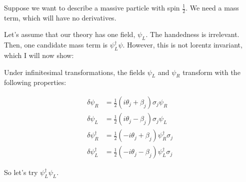 \documentclass{article}
\begin{document}
%	
%	
%	
%	

Suppose we want to describe a massive particle with spin $\frac12$.
We need a mass term, which will have no derivatives.

Let's assume that our theory has one field, $\psi_L$.
The handedness is irrelevant.
Then, one candidate mass term is $\psi_L^\dagger \psi$.
However, this is not lorentz invariant, which I will now show:

Under infinitesimal transformations, the fields $\psi_L$ and $\psi_R$ transform
	with the following properties:

\begin{align}
\delta \psi_R & = \frac12(i \theta_j + \beta_j) \sigma_j \psi_R \\
\delta \psi_L & = \frac12(i \theta_j - \beta_j) \sigma_j \psi_L \\
\delta \psi_R^\dagger & = \frac12( - i \theta_j + \beta_j) \psi_R^\dagger \sigma_j \\
\delta \psi_L^\dagger & = \frac12( - i \theta_j - \beta_j) \psi_L^\dagger \sigma_j 
\end{align}

So let's try $\psi_L^\dagger \psi_L$.
\end{document}
